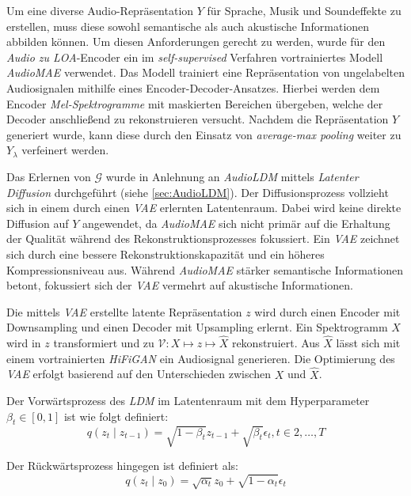 \documentclass[
  a4paper,  %
  twoside,  %
  bibliography=totoc,
  headsepline,
  cleardoublepage=empty,
  parskip=half,
  draft=false
]{scrbook}
\begin{document}
Um eine diverse Audio-Repräsentation $Y$ für Sprache, Musik und Soundeffekte zu erstellen, muss diese sowohl semantische als auch akustische Informationen abbilden können. Um diesen Anforderungen gerecht zu werden, wurde für den \emph{Audio zu LOA}-Encoder ein im \emph{self-supervised} Verfahren vortrainiertes Modell \emph{AudioMAE} \cite{huang_masked_2023} verwendet. Das Modell trainiert eine Repräsentation von ungelabelten Audiosignalen mithilfe eines Encoder-Decoder-Ansatzes. Hierbei werden dem Encoder \emph{Mel-Spektrogramme} mit maskierten Bereichen übergeben, welche der Decoder anschließend zu rekonstruieren versucht. Nachdem die Repräsentation $Y$ generiert wurde, kann diese durch den Einsatz von \emph{average-max pooling} \cite{liu_simple_2023} weiter zu $Y_\lambda$ verfeinert werden. \cite{liu_audioldm2_2023}

Das Erlernen von $\mathcal{G}$ wurde in Anlehnung an \emph{AudioLDM}\cite{liu_audioldm_2023} mittels \emph{Latenter Diffusion}\cite{rombach_high-resolution_2022} durchgeführt (siehe \ref{sec:AudioLDM}). Der Diffusionsprozess vollzieht sich in einem durch einen \emph{VAE}\cite{kingma_auto-encoding_2022} erlernten Latentenraum. Dabei wird keine direkte Diffusion auf $Y$ angewendet, da \emph{AudioMAE} sich nicht primär auf die Erhaltung der Qualität während des Rekonstruktionsprozesses fokussiert. Ein \emph{VAE} zeichnet sich durch eine bessere Rekonstruktionskapazität und ein höheres Kompressionsniveau aus. Während \emph{AudioMAE} stärker semantische Informationen betont, fokussiert sich der \emph{VAE} vermehrt auf akustische Informationen. \cite{liu_audioldm2_2023}

Die mittels \emph{VAE} erstellte latente Repräsentation $z$ wird durch einen Encoder mit Downsampling und einen Decoder mit Upsampling erlernt. Ein Spektrogramm $X$ wird in $z$ transformiert und zu $\mathcal{V}: X \mapsto z \mapsto \hat{X}$ rekonstruiert. Aus $\hat{X}$ lässt sich mit einem vortrainierten \emph{HiFiGAN}\cite{kong_hifi-gan_2020} ein Audiosignal generieren. Die Optimierung des \emph{VAE} erfolgt basierend auf den Unterschieden zwischen $X$ und $\hat{X}$.

Der Vorwärtsprozess des \emph{LDM} im Latentenraum mit dem Hyperparameter $\beta_t \in[0,1]$ ist wie folgt definiert:
\begin{equation}
    q\left(z_t \mid z_{t-1}\right)=\sqrt{1-\beta_t} z_{t-1}+\sqrt{\beta_t} \epsilon_t, t \in 2, \ldots, T
\end{equation}

Der Rückwärtsprozess hingegen ist definiert als:
\begin{equation}
q\left(z_t \mid z_0\right)=\sqrt{\alpha_t} z_0+\sqrt{1-\alpha_t} \epsilon_t
\end{equation}
\end{document}
